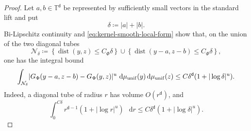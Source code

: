\documentclass[11pt,reqno]{amsart}
\numberwithin{equation}{section}
\theoremstyle{plain}
\theoremstyle{definition}
\DeclarePairedDelimiter{\abs}{\lvert}{\rvert}
\renewcommand{\d}{\mathsf d}
\newcommand{\dd}{\mathop{}\!\mathrm d}
\newcommand{\T}{\mathbb T}
\newcommand{\muunif}{\mu_{\mathrm{unif}}}
\begin{document}
\begin{proof}
Let $a,b\in\T^{\d}$ be represented by sufficiently small vectors in the standard lift and put
\begin{equation}
 \delta\coloneqq|a|+|b|.
 \label{eq:transport-translation-size}
\end{equation}
Bi-Lipschitz continuity and \eqref{eq:kernel-smooth-local-form} show that, on the union of the two diagonal tubes
\begin{equation}
 \mathcal N_\delta
 \coloneqq\left\{\operatorname{dist}(y,z)\leq C_\Phi\delta\right\}
 \cup\left\{\operatorname{dist}(y-a,z-b)\leq C_\Phi\delta\right\},
 \label{eq:transport-near-diagonal-tubes}
\end{equation}
one has the integral bound
\begin{equation}
 \int_{\mathcal N_\delta}
 \abs{G_\Phi(y-a,z-b)-G_\Phi(y,z)}^u
 \,\dd\muunif(y)\dd\muunif(z)
 \leq C\delta^{\d}(1+|\log\delta|^u).
 \label{eq:transport-near-translation-bound}
\end{equation}
Indeed, a diagonal tube of radius $r$ has volume $O(r^{\d})$, and
\begin{equation}
 \int_0^{C\delta}r^{\d-1}(1+|\log r|^u)\,\dd r
 \leq C\delta^{\d}(1+|\log\delta|^u).
 \label{eq:transport-logarithmic-tube-integral}
\end{equation}


\end{proof}
\end{document}
